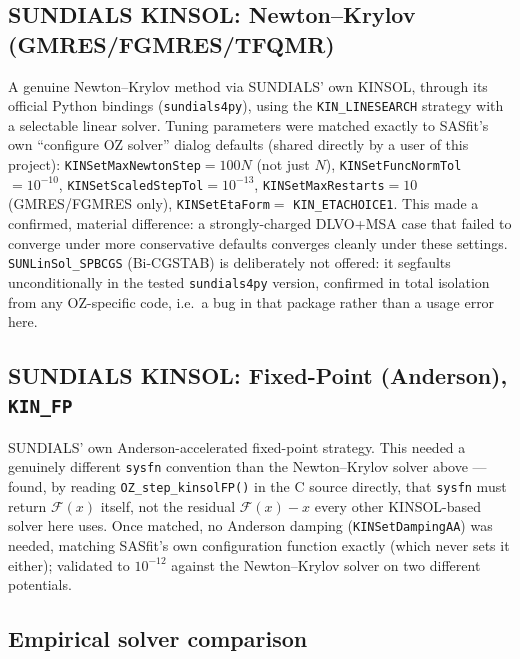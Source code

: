 \documentclass[11pt,a4paper]{article}
\newcommand{\code}[1]{\texttt{#1}}
\begin{document}
\subsection{SUNDIALS KINSOL: Newton--Krylov (GMRES/FGMRES/TFQMR)}
\label{sec:sundials-tuning}
A genuine Newton--Krylov method via SUNDIALS' own KINSOL, through its official
Python bindings (\code{sundials4py}), using the \code{KIN\_LINESEARCH} strategy
with a selectable linear solver. Tuning parameters were matched exactly to
SASfit's own ``configure OZ solver'' dialog defaults (shared directly by a
user of this project): \code{KINSetMaxNewtonStep}$=100N$ (not just $N$),
\code{KINSetFuncNormTol}$=10^{-10}$, \code{KINSetScaledStepTol}$=10^{-13}$,
\code{KINSetMaxRestarts}$=10$ (GMRES/FGMRES only), \code{KINSetEtaForm}$=$
\code{KIN\_ETACHOICE1}. This made a confirmed, material difference: a
strongly-charged DLVO+MSA case that failed to converge under more conservative
defaults converges cleanly under these settings. \code{SUNLinSol\_SPBCGS}
(Bi-CGSTAB) is deliberately not offered: it segfaults unconditionally in the
tested \code{sundials4py} version, confirmed in total isolation from any
OZ-specific code, i.e.\ a bug in that package rather than a usage error here.

\subsection{SUNDIALS KINSOL: Fixed-Point (Anderson), \code{KIN\_FP}}
SUNDIALS' own Anderson-accelerated fixed-point strategy. This needed a
genuinely different \code{sysfn} convention than the Newton--Krylov solver
above --- found, by reading \code{OZ\_step\_kinsolFP()} in the C source
directly, that \code{sysfn} must return $\mathcal{F}(x)$ itself, not the
residual $\mathcal{F}(x)-x$ every other KINSOL-based solver here uses. Once
matched, no Anderson damping (\code{KINSetDampingAA}) was needed, matching
SASfit's own configuration function exactly (which never sets it either);
validated to $10^{-12}$ against the Newton--Krylov solver on two different
potentials.

\subsection{Empirical solver comparison}
\label{sec:solver-comparison}
\end{document}
